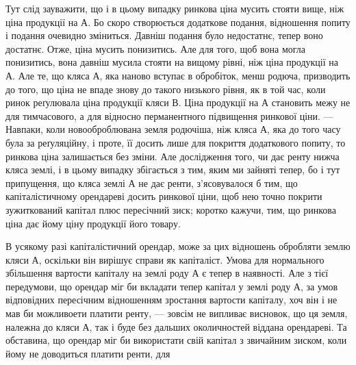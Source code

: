 Тут слід зауважити, що і в цьому випадку ринкова ціна мусить стояти
вище, ніж ціна продукції на А. Бо скоро створюється додаткове подання, відношення
попиту і подання очевидно зміниться. Давніш подання було недостатнє,
тепер воно достатнє. Отже, ціна мусить понизитись. Але для того, щоб вона могла
понизитись, вона давніш мусила стояти на вищому рівні, ніж ціна продукції на А.
Але те, що кляса А, яка наново вступає в обробіток, менш родюча, призводить до
того, що ціна не впаде знову до такого низького рівня, як в той час, коли ринок
реґулювала ціна продукції кляси В. Ціна продукції на А становить межу не для
тимчасового, а для відносно перманентного підвищення ринкової ціни. — Навпаки,
коли новооброблювана земля родючіша, ніж кляса А, яка до того часу була за
реґуляційну, і проте, її досить лише для покриття додаткового попиту, то ринкова
ціна залишається без зміни. Але дослідження того, чи дає ренту нижча
кляса землі, і в цьому випадку збігається з тим, яким ми зайняті тепер, бо
і тут припущення, що кляса землі А не дає ренти, з’ясовувалося б тим, що
капіталістичному орендареві досить ринкової ціни, щоб нею точно покрити
зужиткований капітал плюс пересічний зиск; коротко кажучи, тим, що ринкова
ціна дає йому ціну продукції його товару.

В усякому разі капіталістичний орендар, може за цих відношень обробляти
землю кляси А, оскільки він вирішує справи як капіталіст. Умова для
нормального збільшення вартости капіталу на землі роду А є тепер в наявності.
Але з тієї передумови, що орендар міг би вкладати тепер капітал у землі
роду А, за умов відповідних пересічним відношенням зростання вартости капіталу,
хоч він і не мав би можливоети платити ренту, — зовсім не випливає
висновок, що ця земля, належна до кляси А, так і буде без дальших околичностей
віддана орендареві. Та обставина, що орендар міг би використати свій
капітал з звичайним зиском, коли йому не доводиться платити ренти, для
\parbreak{}  %
